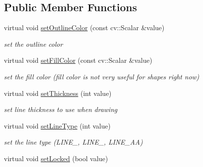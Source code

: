\subsection*{Public Member Functions}
\begin{DoxyCompactItemize}
\item 
virtual void \hyperlink{classcanvascv_1_1CompoundShape_a5b01540c58f0bb5d5a7feccfa38568f9}{set\+Outline\+Color} (const cv\+::\+Scalar \&value)\hypertarget{classcanvascv_1_1CompoundShape_a5b01540c58f0bb5d5a7feccfa38568f9}{}\label{classcanvascv_1_1CompoundShape_a5b01540c58f0bb5d5a7feccfa38568f9}

\begin{DoxyCompactList}\small\item\em set the outline color \end{DoxyCompactList}\item 
virtual void \hyperlink{classcanvascv_1_1CompoundShape_a1c9636ecf2f90a1c532bc8d117f23e79}{set\+Fill\+Color} (const cv\+::\+Scalar \&value)\hypertarget{classcanvascv_1_1CompoundShape_a1c9636ecf2f90a1c532bc8d117f23e79}{}\label{classcanvascv_1_1CompoundShape_a1c9636ecf2f90a1c532bc8d117f23e79}

\begin{DoxyCompactList}\small\item\em set the fill color (fill color is not very useful for shapes right now) \end{DoxyCompactList}\item 
virtual void \hyperlink{classcanvascv_1_1CompoundShape_ac47908d0fb7feb0cb76c4dfa1a3330df}{set\+Thickness} (int value)\hypertarget{classcanvascv_1_1CompoundShape_ac47908d0fb7feb0cb76c4dfa1a3330df}{}\label{classcanvascv_1_1CompoundShape_ac47908d0fb7feb0cb76c4dfa1a3330df}

\begin{DoxyCompactList}\small\item\em set line thickness to use when drawing \end{DoxyCompactList}\item 
virtual void \hyperlink{classcanvascv_1_1CompoundShape_afd64826624ed73c2a5a2ea49ae732b90}{set\+Line\+Type} (int value)\hypertarget{classcanvascv_1_1CompoundShape_afd64826624ed73c2a5a2ea49ae732b90}{}\label{classcanvascv_1_1CompoundShape_afd64826624ed73c2a5a2ea49ae732b90}

\begin{DoxyCompactList}\small\item\em set the line type (L\+I\+N\+E\+\_, L\+I\+N\+E\+\_, L\+I\+N\+E\+\_\+\+AA) \end{DoxyCompactList}\item 
virtual void \hyperlink{classcanvascv_1_1CompoundShape_ab3e29fabe368bd14343e9f7066fbc605}{set\+Locked} (bool value)\hypertarget{classcanvascv_1_1CompoundShape_ab3e29fabe368bd14343e9f7066fbc605}{}\label{classcanvascv_1_1CompoundShape_ab3e29fabe368bd14343e9f7066fbc605}


\end{DoxyCompactItemize}
